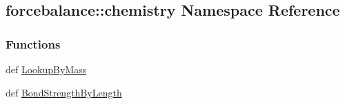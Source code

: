 \hypertarget{namespaceforcebalance_1_1chemistry}{\subsection{forcebalance\-:\-:chemistry \-Namespace \-Reference}
\label{namespaceforcebalance_1_1chemistry}
}
\subsubsection*{\-Functions}
\begin{DoxyCompactItemize}
\item 
def \hyperlink{namespaceforcebalance_1_1chemistry_a7f1904563d4cc7623dcc4fdab5c645a0}{\-Lookup\-By\-Mass}
\item 
def \hyperlink{namespaceforcebalance_1_1chemistry_a843280e0ccfc3059271008be88b38a42}{\-Bond\-Strength\-By\-Length}
\end{DoxyCompactItemize}
